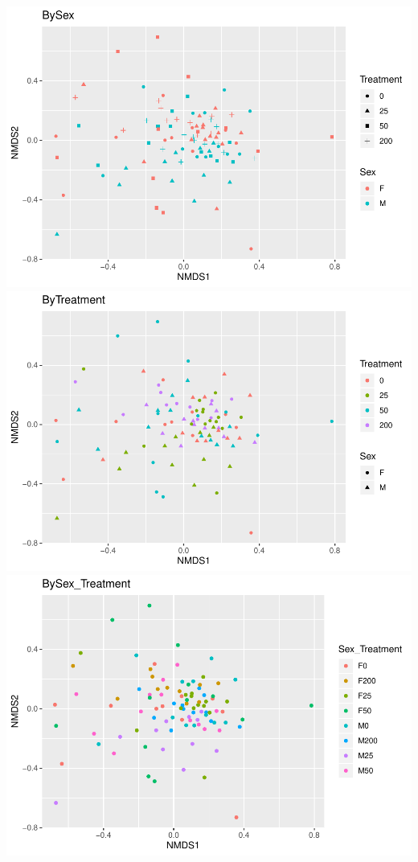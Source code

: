 \documentclass[]{article}
\begin{document}
\includegraphics{Analyses_and_Plots_files/figure-latex/bray_by_Sex_Treatment-1.pdf}
\includegraphics{Analyses_and_Plots_files/figure-latex/bray_by_Sex_Treatment-2.pdf}
\includegraphics{Analyses_and_Plots_files/figure-latex/bray_by_Sex_Treatment-3.pdf}
\end{document}
